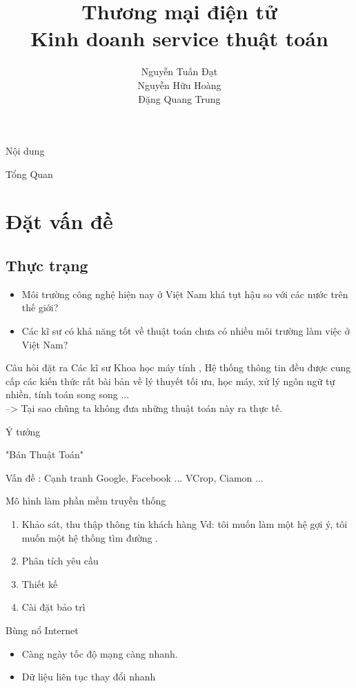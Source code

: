 \documentclass{beamer}
\title[]{{\huge \bf Thương mại điện tử}\\
 \large Kinh doanh service thuật toán }
\author[]{
Nguyễn Tuấn Đạt\\%
Nguyễn Hữu Hoàng \\
Đặng Quang Trung\\
}
\institute[]{
}
\newcommand{\bi}{\begin{itemize}}
\newcommand{\ei}{\end{itemize}}
\begin{document}
\begin{frame}
\titlepage
\end{frame}

\begin{frame}{Nội dung}
\tableofcontents
\end{frame}

\begin{frame}{Tổng Quan}
\section{ Đặt vấn đề}
\subsection{Thực trạng}
\bi 
\item Môi trường công nghệ hiện nay ở Việt Nam khá tụt hậu so với các nước trên thế giới?
\item Các kĩ sư có khả năng tốt về thuật toán chưa có nhiều môi trường làm việc ở Việt Nam?
\ei 

\end{frame}
\begin{frame}{Câu hỏi đặt ra}
Các kĩ sư Khoa học máy tính , Hệ thống thông tin đều được cung cấp các kiến thức rất bài bản về lý thuyết tối ưu, học máy, xử lý ngôn ngữ tự nhiền, tính toán  song song  ... \\
--> Tại sao chũng ta không đưa những thuật toán này ra thực tế. 

\end{frame}
\begin{frame}{Ý tưởng}
\begin{center}
\Large{"Bán Thuật Toán"} \\


\end{center} 
Vấn đề : Cạnh tranh Google,  Facebook ... VCrop, Ciamon ...
\end{frame}
\begin{frame}{Mô hình làm phần mềm truyền thống}
\begin{enumerate}
\item Khảo sát, thu thập thông tin khách hàng Vd: tôi muốn làm một hệ gợi ý, tôi muốn một hệ thống tìm đường .
\item Phân tích yêu cầu 
\item Thiết kế 
\item Cài đặt bảo trì 
\end{enumerate}
\end{frame}
\begin{frame}{Bùng nổ Internet}
\begin{itemize}
\item Càng ngày tốc độ mạng càng nhanh.
\item Dữ liệu liên tục thay đổi nhanh
\end{itemize}

\end{frame}
\end{document}
